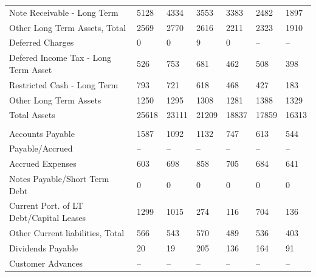 \documentclass[grad,numbers]{coppe}
\begin{document}
\begin{longtable}[t]{lllllll}
  \hspace{1em}Note Receivable - Long Term & 5128 & 4334 & 3553 & 3383 & 2482 & 1897\\
  \hspace{1em}Other Long Term Assets, Total & 2569 & 2770 & 2616 & 2211 & 2323 & 1910\\
  \hspace{1em}\hspace{1em}Deferred Charges & 0 & 0 & 9 & 0 & -- & --\\
  \hspace{1em}\hspace{1em}Defered Income Tax - Long Term Asset & 526 & 753 & 681 & 462 & 508 & 398\\
  \hspace{1em}\hspace{1em}Restricted Cash - Long Term & 793 & 721 & 618 & 468 & 427 & 183\\
  \hspace{1em}\hspace{1em}Other Long Term Assets & 1250 & 1295 & 1308 & 1281 & 1388 & 1329\\
  \hspace{1em}Total Assets & 25618 & 23111 & 21209 & 18837 & 17859 & 16313\\
  \addlinespace[0.3em]
  \multicolumn{7}{l}{\textbf{Liabilities}}\\
  \hspace{1em}Accounts Payable & 1587 & 1092 & 1132 & 747 & 613 & 544\\
  \hspace{1em}Payable/Accrued & -- & -- & -- & -- & -- & --\\
  \hspace{1em}Accrued Expenses & 603 & 698 & 858 & 705 & 684 & 641\\
  \hspace{1em}Notes Payable/Short Term Debt & 0 & 0 & 0 & 0 & 0 & 0\\
  \hspace{1em}Current Port. of LT Debt/Capital Leases & 1299 & 1015 & 274 & 116 & 704 & 136\\
  \hspace{1em}Other Current liabilities, Total & 566 & 543 & 570 & 489 & 536 & 403\\
  \hspace{1em}\hspace{1em}Dividends Payable & 20 & 19 & 205 & 136 & 164 & 91\\
  \hspace{1em}\hspace{1em}Customer Advances & -- & -- & -- & -- & -- & --\\

\end{longtable}
\end{document}
